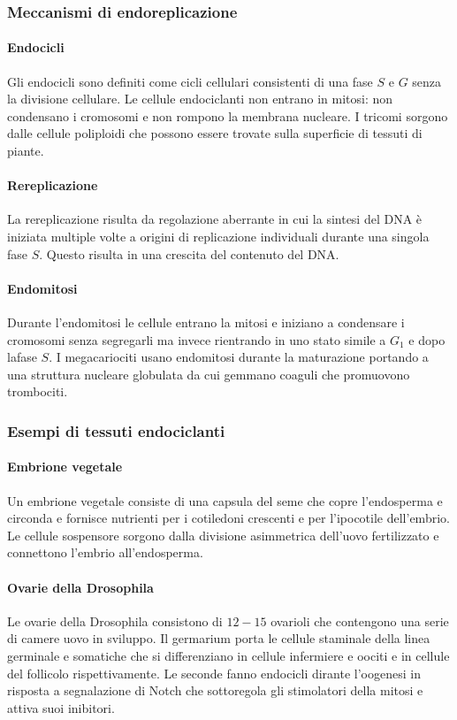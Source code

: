 \subsubsection{Meccanismi di endoreplicazione}
\paragraph{Endocicli}
Gli endocicli sono definiti come cicli cellulari consistenti di una fase $S$ e $G$ senza la divisione cellulare. Le cellule endociclanti non entrano in mitosi: non condensano i 
cromosomi e non rompono la membrana nucleare. I tricomi sorgono dalle cellule poliploidi che possono essere trovate sulla superficie di tessuti di piante. 
\paragraph{Rereplicazione}
La rereplicazione risulta da regolazione aberrante in cui la sintesi del DNA \`e iniziata multiple volte a origini di replicazione individuali durante una singola fase $S$. Questo 
risulta in una crescita del contenuto del DNA.
\paragraph{Endomitosi}
Durante l'endomitosi  le cellule entrano la mitosi e iniziano a condensare i cromosomi senza segregarli ma invece rientrando in uno stato simile a $G_1$ e dopo lafase $S$. I 
megacariociti usano endomitosi durante la maturazione portando a una struttura nucleare globulata da cui gemmano coaguli che promuovono trombociti. 
\subsubsection{Esempi di tessuti endociclanti}
\paragraph{Embrione vegetale}
Un embrione vegetale consiste di una capsula del seme che copre l'endosperma e circonda e fornisce nutrienti per i cotiledoni crescenti e per l'ipocotile dell'embrio. Le cellule 
sospensore sorgono dalla divisione asimmetrica dell'uovo fertilizzato e connettono l'embrio all'endosperma.
\paragraph{Ovarie della Drosophila}
Le ovarie della Drosophila consistono di $12-15$ ovarioli che contengono una serie di camere uovo in sviluppo. Il germarium porta le cellule staminale della linea germinale e somatiche 
che si differenziano in cellule infermiere e oociti e in cellule del follicolo rispettivamente. Le seconde fanno endocicli dirante l'oogenesi in risposta a segnalazione di Notch che 
sottoregola gli stimolatori della mitosi e attiva suoi inibitori. 
